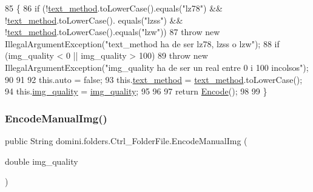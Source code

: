\begin{DoxyCode}
85                                                                              \{
86         \textcolor{keywordflow}{if} (!\hyperlink{classdomini_1_1folders_1_1Ctrl__FolderFile_a75ef571be454360b835f552d2cf20741}{text\_method}.toLowerCase().equals(\textcolor{stringliteral}{"lz78"}) && !\hyperlink{classdomini_1_1folders_1_1Ctrl__FolderFile_a75ef571be454360b835f552d2cf20741}{text\_method}.toLowerCase().
      equals(\textcolor{stringliteral}{"lzss"}) && !\hyperlink{classdomini_1_1folders_1_1Ctrl__FolderFile_a75ef571be454360b835f552d2cf20741}{text\_method}.toLowerCase().equals(\textcolor{stringliteral}{"lzw"}))
87             \textcolor{keywordflow}{throw} \textcolor{keyword}{new} IllegalArgumentException(\textcolor{stringliteral}{"text\_method ha de ser lz78, lzss o lzw"});
88         \textcolor{keywordflow}{if} (img\_quality < 0 || img\_quality > 100)
89             \textcolor{keywordflow}{throw} \textcolor{keyword}{new} IllegalArgumentException(\textcolor{stringliteral}{"img\_quality ha de ser un real entre 0 i 100 incolsos"});
90 
91         
92         this.\textcolor{keyword}{auto} = \textcolor{keyword}{false};
93         this.\hyperlink{classdomini_1_1folders_1_1Ctrl__FolderFile_a75ef571be454360b835f552d2cf20741}{text\_method} = \hyperlink{classdomini_1_1folders_1_1Ctrl__FolderFile_a75ef571be454360b835f552d2cf20741}{text\_method}.toLowerCase();
94         this.\hyperlink{classdomini_1_1folders_1_1Ctrl__FolderFile_a7990a74c394d53a58ebbf4a7872c700d}{img\_quality} = \hyperlink{classdomini_1_1folders_1_1Ctrl__FolderFile_a7990a74c394d53a58ebbf4a7872c700d}{img\_quality};
95         
96 
97         \textcolor{keywordflow}{return} \hyperlink{classdomini_1_1folders_1_1Ctrl__FolderFile_a7c47fd5127ae6f713a4fa7f75002a6f6}{Encode}();          
98         
99     \}
\end{DoxyCode}
\mbox{\label{classdomini_1_1folders_1_1Ctrl__FolderFile_aa12af32101598eebcaaad4d0dbe69902}} 
\subsubsection{\texorpdfstring{Encode\+Manual\+Img()}{EncodeManualImg()}}
{\footnotesize\ttfamily public String domini.\+folders.\+Ctrl\+\_\+\+Folder\+File.\+Encode\+Manual\+Img (\begin{DoxyParamCaption}\item[{double}]{img\+\_\+quality }\end{DoxyParamCaption})\hspace{0.3cm}{\ttfamily [inline]}}



